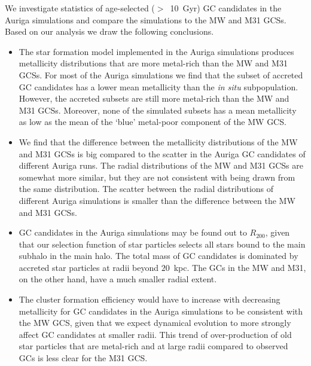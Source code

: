 \documentclass[a4paper,fleqn,usenatbib]{mnras}
\providecommand{\DIFadd}[1]{{\protect\color{blue}\uwave{#1}}} %
\providecommand{\DIFdel}[1]{{\protect\color{red}\sout{#1}}}                      %
\providecommand{\DIFaddbegin}{} %
\providecommand{\DIFaddend}{} %
\providecommand{\DIFdelbegin}{} %
\providecommand{\DIFdelend}{} %
\newcommand{\DIFscaledelfig}{0.5}
\newlength{\DIFdelgraphicswidth} %
\newlength{\DIFdelgraphicsheight} %
\newcommand{\DIFaddincludegraphics}[2][]{{\color{blue}\fbox{\DIFOincludegraphics[#1]{#2}}}} %
\newcommand{\DIFdelincludegraphics}[2][]{%
\sbox{\DIFdelgraphicsbox}{\DIFOincludegraphics[#1]{#2}}%
\settoboxwidth{\DIFdelgraphicswidth}{\DIFdelgraphicsbox} %
\settoboxtotalheight{\DIFdelgraphicsheight}{\DIFdelgraphicsbox} %
\scalebox{\DIFscaledelfig}{%
\parbox[b]{\DIFdelgraphicswidth}{\usebox{\DIFdelgraphicsbox}\\[-\baselineskip] \rule{\DIFdelgraphicswidth}{0em}}\llap{\resizebox{\DIFdelgraphicswidth}{\DIFdelgraphicsheight}{%
\setlength{\unitlength}{\DIFdelgraphicswidth}%
\begin{picture}(1,1)%
\thicklines\linethickness{2pt} %
{\color[rgb]{1,0,0}\put(0,0){\framebox(1,1){}}}%
{\color[rgb]{1,0,0}\put(0,0){\line( 1,1){1}}}%
{\color[rgb]{1,0,0}\put(0,1){\line(1,-1){1}}}%
\end{picture}%
}\hspace*{3pt}}} %
} %
\DeclareRobustCommand{\DIFaddbegin}{\DIFOaddbegin \let\includegraphics\DIFaddincludegraphics} %
\DeclareRobustCommand{\DIFaddend}{\DIFOaddend \let\includegraphics\DIFOincludegraphics} %
\DeclareRobustCommand{\DIFdelbegin}{\DIFOdelbegin \let\includegraphics\DIFdelincludegraphics} %
\DeclareRobustCommand{\DIFdelend}{\DIFOaddend \let\includegraphics\DIFOincludegraphics} %
\begin{document}
We investigate statistics of age-selected ($>$~10~Gyr) GC candidates in the 
Auriga simulations and compare the simulations to the MW and M31 GCSs. Based on
our analysis we draw the following conclusions.

\begin{itemize}
    \item The star formation model implemented in the Auriga simulations produces
    metallicity distributions that are more metal-rich than the MW and M31
    GCSs. For most of the Auriga simulations we find that the subset of accreted 
    GC candidates has a lower mean metallicity than the {\it in situ} subpopulation.
    However, the accreted subsets are still more metal-rich than the MW and M31 GCSs.
    Moreover, none of the simulated subsets has a mean metallicity as low as the mean
    of the `blue' metal-poor component of the MW GCS.

    \item We find that the difference between the metallicity distributions of 
    the MW and M31 GCSs is big compared to the scatter in the Auriga GC candidates 
    of different Auriga runs. The radial distributions of the MW and M31 GCSs are
    somewhat more similar, but they are not consistent with being drawn from the
    same distribution. The scatter between the radial distributions of different
    Auriga simulations is smaller than the difference between the MW and M31 GCSs.

    \item GC candidates in the Auriga simulations may be found out to \DIFdelbegin \DIFdel{$R_{200}$}\DIFdelend \DIFaddbegin \DIFadd{$r_{200}$}\DIFaddend ,
    given that our selection function of star particles selects all stars bound
    to the main subhalo in the main halo. The total mass of GC candidates is 
    dominated by accreted star particles at radii beyond $20$~kpc. The GCs in 
    the MW and M31, on the other hand, have a much smaller radial extent.

    \item The cluster formation efficiency would have to increase with decreasing
    metallicity for GC candidates in the Auriga simulations to be consistent
    with the MW GCS, given that we expect dynamical evolution to 
    more strongly affect GC candidates at smaller radii. This trend of over-production
    of old star particles that are metal-rich and at large radii compared to 
    observed GCs is less clear for the M31 GCS.

\end{itemize}
\end{document}
